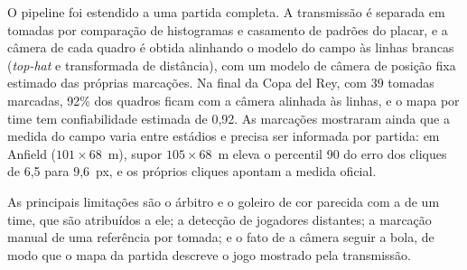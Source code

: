\documentclass[12pt]{article}
\begin{document}
O pipeline foi estendido a uma partida completa. A transmissão é separada em
tomadas por comparação de histogramas e casamento de padrões do placar, e a câmera
de cada quadro é obtida alinhando o modelo do campo às linhas brancas (\textit{top-hat}
e transformada de distância), com um modelo de câmera de posição fixa estimado das
próprias marcações. Na final da Copa del Rey, com 39 tomadas marcadas, 92\% dos
quadros ficam com a câmera alinhada às linhas, e o mapa por time tem confiabilidade
estimada de 0,92.
As marcações mostraram ainda que a medida do campo varia entre estádios e precisa
ser informada por partida: em Anfield ($101\times68$~m), supor $105\times68$~m eleva o
percentil 90 do erro dos cliques de 6,5 para 9,6~px, e os próprios cliques apontam a
medida oficial.

As principais limitações são o árbitro e o goleiro de cor parecida com a de um time,
que são atribuídos a ele; a detecção de jogadores distantes; a marcação manual de
uma referência por tomada; e o fato de a câmera seguir a bola, de modo que o mapa da
partida descreve o jogo mostrado pela transmissão.
\end{document}
